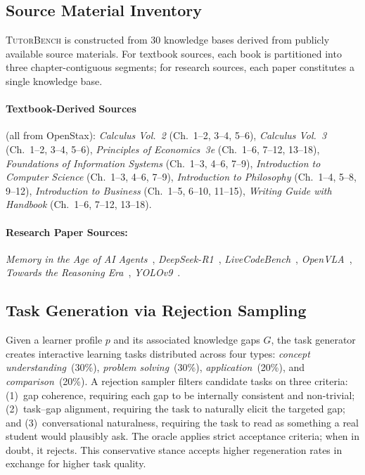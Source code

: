 \subsection{Source Material Inventory}
\label{app:tutorbench:sources}

\textsc{TutorBench} is constructed from 30 knowledge bases derived from publicly available source materials.
For textbook sources, each book is partitioned into three chapter-contiguous segments; for research sources, each paper constitutes a single knowledge base.

\paragraph{Textbook-Derived Sources} (all from OpenStax):
\emph{Calculus Vol.~2} (Ch.~1--2, 3--4, 5--6),
\emph{Calculus Vol.~3} (Ch.~1--2, 3--4, 5--6),
\emph{Principles of Economics~3e} (Ch.~1--6, 7--12, 13--18),
\emph{Foundations of Information Systems} (Ch.~1--3, 4--6, 7--9),
\emph{Introduction to Computer Science} (Ch.~1--3, 4--6, 7--9),
\emph{Introduction to Philosophy} (Ch.~1--4, 5--8, 9--12),
\emph{Introduction to Business} (Ch.~1--5, 6--10, 11--15),
\emph{Writing Guide with Handbook} (Ch.~1--6, 7--12, 13--18).

\paragraph{Research Paper Sources:}
\emph{Memory in the Age of AI Agents}~\citep{hu2025memory},
\emph{DeepSeek-R1}~\citep{guo2025deepseekr1},
\emph{LiveCodeBench}~\citep{jain2025livecodebench},
\emph{OpenVLA}~\citep{kim2025openvla},
\emph{Towards the Reasoning Era}~\citep{chen2025towardsreasoningera},
\emph{YOLOv9}~\citep{wang2024yolov9}.

\subsection{Task Generation via Rejection Sampling}
\label{app:tutorbench:task}

Given a learner profile $p$ and its associated knowledge gaps $G$, the task generator creates interactive learning tasks distributed across four types:
\emph{concept understanding}~(30\%), \emph{problem solving}~(30\%), \emph{application}~(20\%), and \emph{comparison}~(20\%).
A rejection sampler filters candidate tasks on three criteria:
(1)~gap coherence, requiring each gap to be internally consistent and non-trivial;
(2)~task--gap alignment, requiring the task to naturally elicit the targeted gap;
and (3)~conversational naturalness, requiring the task to read as something a real student would plausibly ask.
The oracle applies strict acceptance criteria; when in doubt, it rejects.
This conservative stance accepts higher regeneration rates in exchange for higher task quality.

